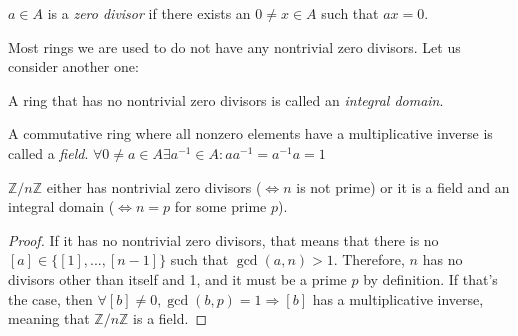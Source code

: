 \begin{definition}
  $a \in A$ is a \emph{zero divisor} if there exists an $0 \neq x \in A$ such that $ax = 0$. 
\end{definition}
Most rings we are used to do not have any nontrivial zero divisors. Let us consider another one: 

\begin{definition}
  A ring that has no nontrivial zero divisors is called an \emph{integral domain}.
\end{definition}
\begin{definition}
  A commutative ring where all nonzero elements have a multiplicative inverse is called a \emph{field}. $\forall 0 \neq a \in A \exists a^{-1} \in A : a a^{-1} = a^{-1} a = 1$
\end{definition}
\begin{corollary}
  $\mathbb{Z}/n\mathbb{Z}$ either has nontrivial zero divisors ($\Leftrightarrow n$ is not prime) or it is a field and an integral domain ($\Leftrightarrow n = p$ for some prime $p$). 
\end{corollary}
\begin{proof}
  If it has no nontrivial zero divisors, that means that there is no $[a] \in \{[1], ..., [n - 1]\}$ such that $\gcd(a, n) > 1$. Therefore, $n$ has no divisors other than itself and 1, and it must be a prime $p$ by definition. If that's the case, then $\forall [b] \neq 0, \gcd(b, p) = 1 \Rightarrow [b]$ has a multiplicative inverse, meaning that $\mathbb{Z}/n\mathbb{Z}$ is a field.
\end{proof}

